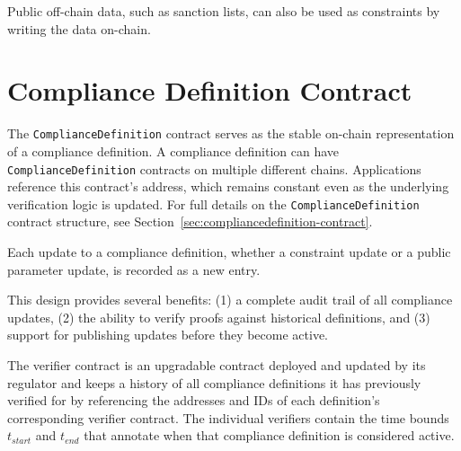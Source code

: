 \documentclass[9pt]{extreport}
\begin{document}
Public off-chain data, such as sanction lists, can also be used as constraints by writing the data on-chain.

\section{Compliance Definition Contract}

The \texttt{ComplianceDefinition} contract serves as the stable on-chain representation of a compliance definition.  A compliance definition can have \texttt{ComplianceDefinition} contracts on multiple different chains. Applications reference this contract's address, which remains constant even as the underlying verification logic is updated.  For full details on the \texttt{ComplianceDefinition} contract structure, see Section~\ref{sec:compliancedefinition-contract}.

Each update to a compliance definition, whether a constraint update or a public parameter update, is recorded as a new entry. 

This design provides several benefits: (1) a complete audit trail of all compliance updates, (2) the ability to verify proofs against historical definitions, and (3) support for publishing updates before they become active.

The verifier contract is an upgradable contract deployed and updated by its regulator and keeps a history of all compliance definitions it has previously verified for by referencing the addresses and IDs of each definition's corresponding verifier contract.  The individual verifiers contain the time bounds $t_{start}$ and $t_{end}$ that annotate when that compliance definition is considered active.   
\end{document}
